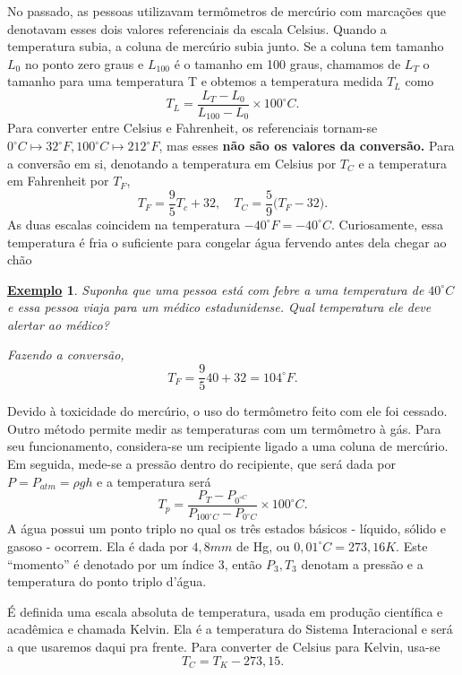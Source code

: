 \documentclass{article}
\newtheorem{example}{\underline{Exemplo}}
\begin{document}
  No passado, as pessoas utilizavam termômetros de mercúrio com marcações que denotavam esses dois valores referenciais da escala Celsius. Quando a temperatura subia, a coluna
de mercúrio subia junto. Se a coluna tem tamanho \(L_{0}\) no ponto zero graus e \(L_{100}\) é o tamanho em 100 graus, chamamos de \(L_{T}\) o tamanho para uma temperatura T e obtemos a 
temperatura medida \(T_{L}\) como 
  \[
    T_{L} = \frac{L_{T} - L_{0}}{L_{100}-L_{0}}\times 100^{\circ{}}C.
  \]
  Para converter entre Celsius e Fahrenheit, os referenciais tornam-se \(0^{\circ{}}C\mapsto 32^{\circ{}}F, 100^{\circ{}}C\mapsto 212^{\circ{}}F\), mas esses \textbf{não são os valores da conversão.}
Para a conversão em si, denotando a temperatura em Celsius por \(T_{C}\) e a temperatura em Fahrenheit por \(T_{F}\),
  \[
    T_{F} = \frac{9}{5}T_{c} + 32,\quad T_{C} = \frac{5}{9}\biggl(T_{F}-32\biggr).
  \]
  As duas escalas coincidem na temperatura \(-40^{\circ{}}F = -40^{\circ{}}C\). Curiosamente, essa temperatura é fria o suficiente para congelar água fervendo antes dela chegar ao chão
\begin{example}
  Suponha que uma pessoa está com febre a uma temperatura de \(40^{\circ{}}C\) e essa pessoa viaja para um médico estadunidense. Qual temperatura ele deve alertar ao médico?

  Fazendo a conversão, 
    \[
      T_{F} = \frac{9}{5}40 +32 = 104^{\circ{}}F.
    \]
\end{example}
  Devido à toxicidade do mercúrio, o uso do termômetro feito com ele foi cessado. Outro método permite medir as temperaturas com um termômetro à gás. Para seu funcionamento,
considera-se um recipiente ligado a uma coluna de mercúrio. Em seguida, mede-se a pressão dentro do recipiente, que será dada por \(P = P_{atm} = \rho gh\) e a temperatura será 
  \[
    T_{p} = \frac{P_{T} - P_{0^{\circ{}C}}}{P_{100^{\circ{}}C}-P_{0^{\circ{}}C}}\times 100^{\circ{}}C.
  \]
  A água possui um ponto triplo no qual os três estados básicos - líquido, sólido e gasoso - ocorrem. Ela é dada por \(4,8mm\) de Hg, ou \(0,01^{\circ{}}C = 273,16K\). 
Este ``momento'' é denotado por um índice 3, então \(P_{3}, T_{3}\) denotam a pressão e a temperatura do ponto triplo d'água. 

  É definida uma escala absoluta de temperatura, usada em produção científica e acadêmica e chamada Kelvin. Ela é a temperatura do Sistema Interacional e será a que usaremos
daqui pra frente. Para converter de Celsius para Kelvin, usa-se 
  \[
    T_{C} = T_{K} - 273,15.
  \]
\end{document}

